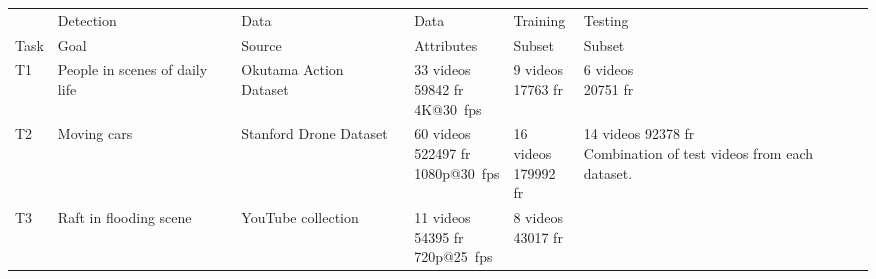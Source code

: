 \begin{table}
  \centering
  \begin{tabular}{|p{1cm}|p{2.5cm}|p{2.5cm}|p{2.5cm}|p{2.5cm}|p{2.5cm}|}
    \hline
         & Detection                               & Data                                                  & Data                           & Training & Testing \\
    Task & Goal                                    & Source                                                & Attributes                     & Subset   & Subset  \\
    \hline
    T1   & {\small People in scenes of daily life} & {\small Okutama Action Dataset~\cite{Barekatain2017}} & \makecell[tl]{\small 33 videos                      \\\small 59842 fr\\\small 4K@30~fps}&\makecell[tl]{\small 9 videos\\\small 17763 fr}&\makecell[tl]{\small 6 videos\\\small 20751 fr}\\
    \hline
    T2   & {\small Moving cars}                    & {\small Stanford Drone Dataset~\cite{Robicquet2016}}  & \makecell[tl]{\small 60 videos                      \\\small 522497 fr\\\small 1080p@30~fps}&\makecell[tl]{\small 16 videos\\\small 179992 fr} & \multirow{4}{*}{\parbox{1.5cm}{\centering\small 14 videos 92378 fr\\ Combination of test videos from each dataset.}} \\ \cline{1-5}
    T3   & {\small Raft in flooding scene}         & {\small YouTube collection~\cite{YouTube1}}           & \makecell[tl]{\small 11 videos                      \\\small 54395 fr\\\small 720p@25~fps}&\makecell[tl]{\small 8 videos\\\small 43017 fr} & \\ \cline{1-5}

\end{tabular}
\end{table}
